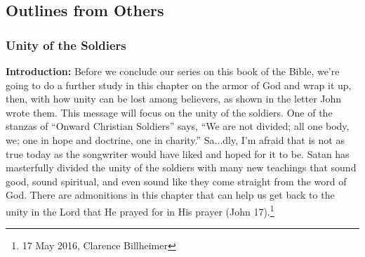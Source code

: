 \subsection{Outlines from Others}

\subsubsection{Unity of the Soldiers}
\textbf{Introduction:} Before we conclude our series on this book of the Bible, we’re going to do a further study in this chapter on the armor of God and wrap it up, then, with how unity can be lost among believers, as shown in the letter John wrote them. This message will focus on the unity of the soldiers. One of the stanzas of “Onward Christian Soldiers” says, “We are not divided; all one body, we; one in hope and doctrine, one in charity.” Sa...dly, I’m afraid that is not as true today as the songwriter would have liked and hoped for it to be. Satan has masterfully divided the unity of the soldiers with many new teachings that sound good, sound spiritual, and even sound like they come straight from the word of God. There are admonitions in this chapter that can help us get back to the unity in the Lord that He prayed for in His prayer (John 17).\footnote{17 May 2016, Clarence Billheimer}
